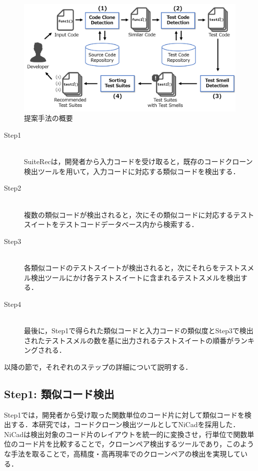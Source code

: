 \documentclass[12pt]{jarticle} %
\begin{document}
\begin{figure}[htbp]
  \begin{center}
    \includegraphics[clip,width=15cm]{SuiteRec-outline.pdf}
    \caption{提案手法の概要}
    \label{SO}
  \end{center}
\end{figure}

\newpage
\begin{description}
\item[Step1]~\\
{\sf SuiteRec}は，開発者から入力コードを受け取ると，既存のコードクローン検出ツールを用いて，入力コードに対応する類似コードを検出する．
\item[Step2]~\\
複数の類似コードが検出されると，次にその類似コードに対応するテストスイートをテストコードデータベース内から検索する．
\item[Step3]~\\
各類似コードのテストスイートが検出されると，次にそれらをテストスメル検出ツールにかけ各テストスイートに含まれるテストスメルを検出する．
\item[Step4]~\\
最後に，Step1で得られた類似コードと入力コードの類似度とStep3で検出されたテストスメルの数を基に出力されるテストスイートの順番がランキングされる．
\end{description}

以降の節で，それぞれのステップの詳細について説明する．

\subsection{Step1: 類似コード検出}

Step1では，開発者から受け取った関数単位のコード片に対して類似コードを検出する．本研究では，コードクローン検出ツールとして{\sf NiCad}\cite{b2}を採用した．{\sf NiCad}は検出対象のコード片のレイアウトを統一的に変換させ，行単位で関数単位のコード片を比較することで，クローンペア検出するツールであり，このような手法を取ることで，高精度・高再現率でのクローンペアの検出を実現している．
\end{document}
